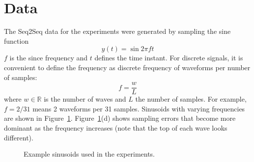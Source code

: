 \documentclass[final]{article}
\begin{document}
\section{Data}
\label{sec:data}

The Seq2Seq data for the experiments were generated by sampling the sine function
\[
y(t) = \sin{2\pi ft}
\]
$f$ is the since frequency and $t$ defines the time instant. For discrete signals, it is convenient to define the
frequency as discrete frequency of waveforms per number of samples:
\[
 f = \frac{w}{L}
\]
where $w \in \mathbb{R}$ is the number of waves and $L$ the number of samples. For example, $f=2/31$ means
2 waveforms per 31 samples. Sinusoids with varying frequencies are shown in Figure~\ref{fig:sin_examples}. Figure~\ref{fig:sin_examples}(d) shows sampling errors that become more dominant as the frequency increases (note that the top of each wave looks different).

\begin{figure}[h]
  \centering
  \caption{Example sinusoids used in the experiments.\label{fig:sin_examples}}
\end{figure}
\end{document}
